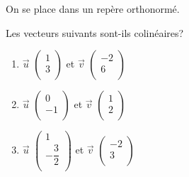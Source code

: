 
\begin{exercice}
On se place dans un repère orthonormé.

Les vecteurs suivants sont-ils colinéaires?
\begin{enumerate}
\item $\overrightarrow{u}$ 
$\begin{pmatrix}
1\\ 3\\
\end{pmatrix}$ et $\overrightarrow{v}$ 
$\begin{pmatrix}
-2\\ 6\\
\end{pmatrix}$
\item $\overrightarrow{u}$ 
$\begin{pmatrix}
0\\ -1\\
\end{pmatrix}$ et $\overrightarrow{v}$ 
$\begin{pmatrix}
1\\ 2\\
\end{pmatrix}$
\item $\overrightarrow{u}$ 
$\begin{pmatrix}
1\\ -\dfrac{3}{2}\\
\end{pmatrix}$ et $\overrightarrow{v}$ 
$\begin{pmatrix}
-2\\ 3\\
\end{pmatrix}$
\end{enumerate}
\end{exercice}

